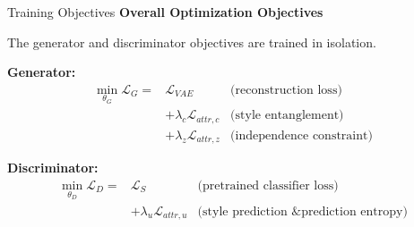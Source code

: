 \documentclass{beamer}
\begin{document}
  \begin{frame}{Training Objectives}
    \textbf{Overall Optimization Objectives}
    
    The generator and discriminator objectives are trained in isolation.

    \textbf{Generator:}
    \begin{eqnarray*}
      \operatorname*{min}_{\theta_G} \mathcal{L}_G =
        & \mathcal{L}_{VAE} & \text{(reconstruction loss)} \\ 
        & + \lambda_c \mathcal{L}_{attr,c} & \text{(style entanglement)} \\ 
        & + \lambda_z \mathcal{L}_{attr,z} & \text{(independence constraint)}
    \end{eqnarray*}

    \textbf{Discriminator:}
    \begin{eqnarray*}
      \operatorname*{min}_{\theta_D} \mathcal{L}_D =
        & \mathcal{L}_{S} & \text{(pretrained classifier loss)} \\
        & + \lambda_u \mathcal{L}_{attr,u} & \text{(style prediction \& prediction entropy)}
    \end{eqnarray*}

  \end{frame}
\end{document}
